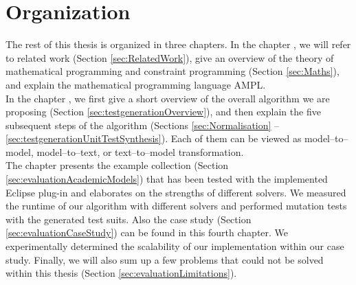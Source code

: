 \section{Organization}
The rest of this thesis is organized in three chapters. In the chapter , we will refer to related work (Section \ref{sec:RelatedWork}), %
give an overview of the theory of mathematical programming and constraint programming (Section \ref{sec:Maths}), and explain the mathematical programming language AMPL.\\
In the chapter , we first give a short overview of the overall algorithm we are proposing (Section \ref{sec:testgenerationOverview}), and then explain the five subsequent steps of the algorithm (Sections \ref{sec:Normalisation} -- \ref{sec:testgenerationUnitTestSynthesis}). Each of them can be viewed as model--to--model, model--to--text, or text--to--model transformation. 
\\
The chapter  presents the example collection (Section \ref{sec:evaluationAcademicModels}) that has been tested with the implemented Eclipse plug-in and elaborates on the strengths of different solvers. We measured the runtime of our algorithm with different solvers and performed mutation tests with the generated test suits. Also the case study (Section \ref{sec:evaluationCaseStudy}) can be found in this fourth chapter. We experimentally determined the scalability of our implementation within our case study. Finally, we will also sum up a few problems that could not be solved within this thesis (Section \ref{sec:evaluationLimitations}).
